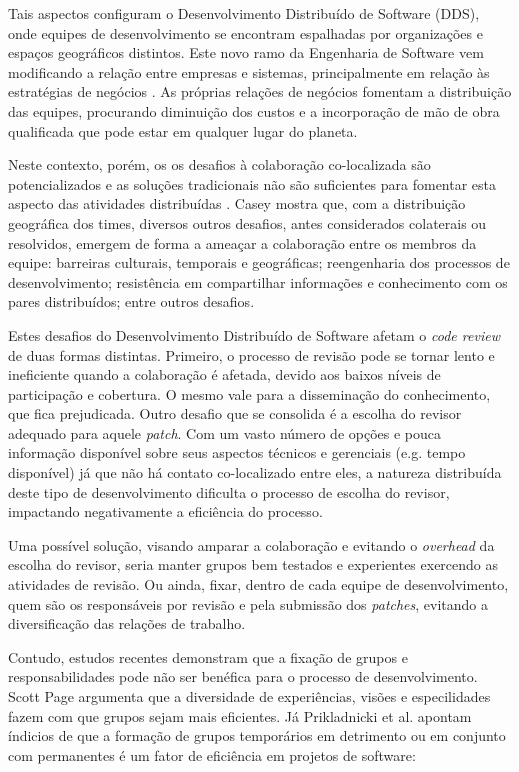 \documentclass[12pt,openany,oneside,a4paper,english,brazil]{abntbibufjf}
\begin{document}
  Tais aspectos configuram o Desenvolvimento Distribuído de Software (DDS), onde equipes de desenvolvimento se encontram espalhadas por organizações e espaços geográficos distintos. Este novo ramo da Engenharia de Software vem modificando a relação entre empresas e sistemas, principalmente em relação às estratégias de negócios \cite{audy2007}. As próprias relações de negócios fomentam a distribuição das equipes, procurando diminuição dos custos e a incorporação de mão de obra qualificada que pode estar em qualquer lugar do planeta.

  Neste contexto, porém, os os desafios à colaboração co-localizada são potencializados e as soluções tradicionais não são suficientes para fomentar esta aspecto das atividades distribuídas \cite{nicolaci2011}. Casey \cite{casey2010} mostra que, com a distribuição geográfica dos times, diversos outros desafios, antes considerados colaterais ou resolvidos, emergem de forma a ameaçar a colaboração entre os membros da equipe: barreiras culturais, temporais e geográficas; reengenharia dos processos de desenvolvimento; resistência em compartilhar informações e conhecimento com os pares distribuídos; entre outros desafios.

  Estes desafios do Desenvolvimento Distribuído de Software afetam o \textit{code review} de duas formas distintas. Primeiro, o processo de revisão pode se tornar lento e ineficiente quando a colaboração é afetada, devido aos baixos níveis de participação e cobertura. O mesmo vale para a disseminação do conhecimento, que fica prejudicada. Outro desafio que se consolida é a escolha do revisor adequado para aquele \textit{patch}. Com um vasto número de opções e pouca informação disponível sobre seus aspectos técnicos e gerenciais (e.g. tempo disponível) já que não há contato co-localizado entre eles, a natureza distribuída deste tipo de desenvolvimento dificulta o processo de escolha do revisor, impactando negativamente a eficiência do processo.

  Uma possível solução, visando amparar a colaboração e evitando o \textit{overhead} da escolha do revisor, seria manter grupos bem testados e experientes exercendo as atividades de revisão. Ou ainda, fixar, dentro de cada equipe de desenvolvimento, quem são os responsáveis por revisão e pela submissão dos \textit{patches}, evitando a diversificação das relações de trabalho.

  Contudo, estudos recentes demonstram que a fixação de grupos e responsabilidades pode não ser benéfica para o processo de desenvolvimento. Scott Page \cite{page2008} argumenta que a diversidade de experiências, visões e especilidades fazem com que grupos sejam mais eficientes. Já Prikladnicki et al. \cite{prikladnicki2017} apontam índicios de que a formação de grupos temporários em detrimento ou em conjunto com permanentes é um fator de eficiência em projetos de software:
\end{document}
